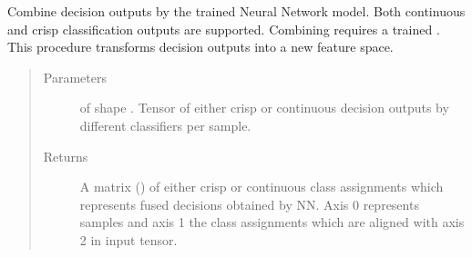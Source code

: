 \documentclass[letterpaper,10pt,english]{sphinxmanual}
\begin{document}
\begin{fulllineitems}
\begin{fulllineitems}
\begin{quote}
\begin{description}
\begin{itemize}
\end{itemize}

\end{description}\end{quote}

\end{fulllineitems}


\begin{fulllineitems}
\label{\detokenize{pusion.core.neural_network_combiner:pusion.core.neural_network_combiner.NeuralNetworkCombiner.combine}}
\sphinxAtStartPar
Combine decision outputs by the trained Neural Network model. Both continuous and crisp classification outputs
are supported. Combining requires a trained {\hyperref[\detokenize{pusion.core.neural_network_combiner:pusion.core.neural_network_combiner.NeuralNetworkCombiner}]{}}. This procedure transforms decision
outputs into a new feature space.
\begin{quote}\begin{description}
\item[{Parameters}] \leavevmode
\sphinxAtStartPar
{} \textendash{}  of shape .
Tensor of either crisp or continuous decision outputs by different classifiers per sample.

\item[{Returns}] \leavevmode
\sphinxAtStartPar
A matrix () of either crisp or continuous class assignments which represents fused
decisions obtained by NN. Axis 0 represents samples and axis 1 the class assignments which are aligned
with axis 2 in  input tensor.

\end{description}\end{quote}

\end{fulllineitems}


\end{fulllineitems}

\end{document}
